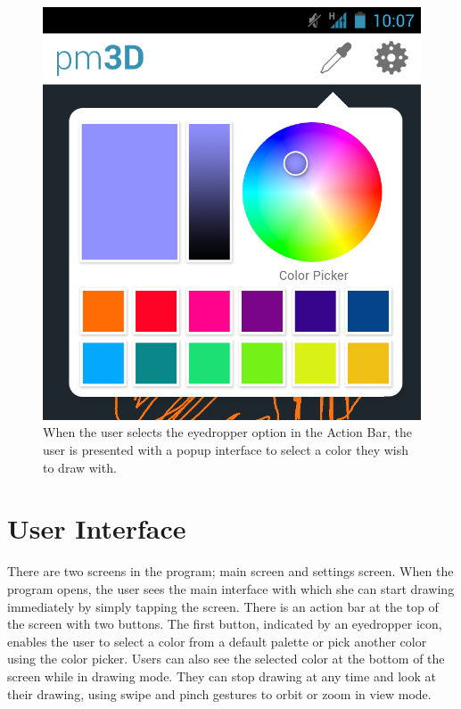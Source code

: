 \documentclass{chi-ext}
\begin{document}
\begin{figure}
\hspace{\columnwidth}%
\parbox{\columnwidth}{
  \centering
  \includegraphics[width=\columnwidth]{colorpicker.jpg}
  \caption{When the user selects the eyedropper option in the Action Bar, the user is presented with a popup interface to select a color they wish to draw with.}
  \label{fig:colorpicker}
}
\end{figure}


\section{User Interface}

There are two screens in the program; main screen and settings screen. When
the program opens, the user sees the main interface with which she can start
drawing immediately by simply tapping the screen. There is an action bar at
the top of the screen with two buttons. The first button, indicated by an
eyedropper icon, enables the user to select a color from a default palette or
pick another color using the color picker. Users can also see the selected
color at the bottom of the screen while in drawing mode. They can stop drawing
at any time and look at their drawing, using swipe and pinch gestures to orbit
or zoom in view mode.
\end{document}
